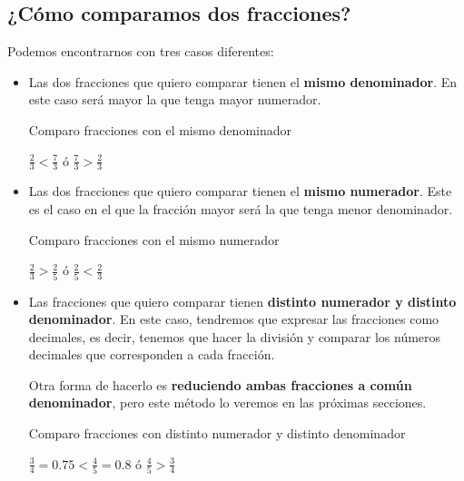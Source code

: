 \subsection{¿Cómo comparamos dos fracciones?}

Podemos encontrarnos con tres casos diferentes:

\begin{itemize}
    \item Las dos fracciones que quiero comparar tienen el \textbf{mismo denominador}. En este caso será mayor la que tenga mayor numerador.

    \begin{ejemplos}[label={Ejemplo:mismoDenominador}]{Comparo fracciones con el mismo denominador}
        \begin{center}
            $\displaystyle \frac{2}{3} < \frac{7}{3}$ \qquad ó \qquad $\displaystyle \frac{7}{3} > \frac{2}{3}$
        \end{center}
    \end{ejemplos}
    
    \item Las dos fracciones que quiero comparar tienen el \textbf{mismo numerador}. Este es el caso en el que la fracción mayor será la que tenga menor denominador.

    \begin{ejemplos}[label={Ejemplo:mismoNumerador}]{Comparo fracciones con el mismo numerador}
        \begin{center}
            $\displaystyle \frac{2}{3} > \frac{2}{5}$ \qquad ó \qquad $\displaystyle \frac{2}{5} < \frac{2}{3}$
        \end{center}
    \end{ejemplos}

    \item Las fracciones que quiero comparar tienen \textbf{distinto numerador y distinto denominador}. En este caso, tendremos que expresar las fracciones como decimales, es decir, tenemos que hacer la división y comparar los números decimales que corresponden a cada fracción.

    Otra forma de hacerlo es \textbf{reduciendo ambas fracciones a común denominador}, pero este método lo veremos en las próximas secciones.

    \begin{ejemplos}[label={Ejemplo:distintoNumeradorDenominador}]{Comparo fracciones con distinto numerador y distinto denominador}
        \begin{center}
            $\displaystyle \frac{3}{4} = 0.75 < \frac{4}{5} = 0.8$ \qquad ó \qquad $\displaystyle \frac{4}{5} > \frac{3}{4}$
        \end{center}
    \end{ejemplos}
\end{itemize}

